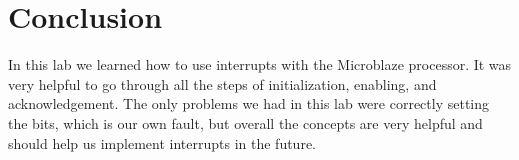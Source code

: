 \documentclass[10pt]{article}
\begin{document}
  \section*{Conclusion}
    In this lab we learned how to use interrupts with the Microblaze processor. It was very helpful to go through all the steps of initialization, enabling, and acknowledgement. The only problems we had in this lab were correctly setting the bits, which is our own fault, but overall the concepts are very helpful and should help us implement interrupts in the future.
\end{document}
